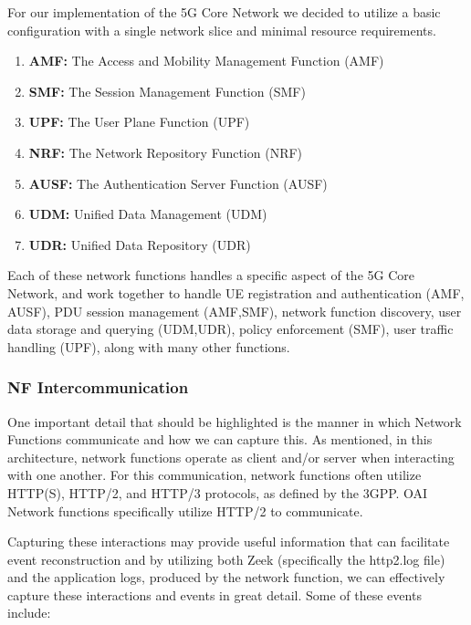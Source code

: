 \documentclass[final,1p,times,authoryear]{elsarticle}
\begin{document}
For our implementation of the 5G Core Network we decided to utilize a basic configuration with a single network slice and minimal resource requirements.

\begin{enumerate}
    \item \textbf{AMF:} The Access and Mobility Management Function (AMF)
    \item \textbf{SMF:} The Session Management Function (SMF)
    \item \textbf{UPF:} The User Plane Function (UPF)
    \item \textbf{NRF:} The Network Repository Function (NRF)
    \item \textbf{AUSF:} The Authentication Server Function (AUSF)
    \item \textbf{UDM:} Unified Data Management (UDM)
    \item \textbf{UDR:} Unified Data Repository (UDR)
\end{enumerate}

Each of these network functions handles a specific aspect of the 5G Core Network, and work together to handle UE registration and authentication (AMF, AUSF), PDU session management (AMF,SMF), network function discovery, user data storage and querying (UDM,UDR), policy enforcement (SMF), user traffic handling (UPF), along with many other functions.

\subsubsection{NF Intercommunication}
\label{sub3sub6sec2}
One important detail that should be highlighted is the manner in which Network Functions communicate and how we can capture this. As mentioned, in this architecture, network functions operate as client and/or server when interacting with one another. For this communication, network functions often utilize HTTP(S), HTTP/2, and HTTP/3 protocols, as defined by the 3GPP. OAI Network functions specifically utilize HTTP/2 to communicate.

\vspace{1em}

Capturing these interactions may provide useful information that can facilitate event reconstruction and by utilizing both Zeek (specifically the http2.log file) and the application logs, produced by the network function, we can effectively capture these interactions and events in great detail. Some of these events include:
\end{document}
